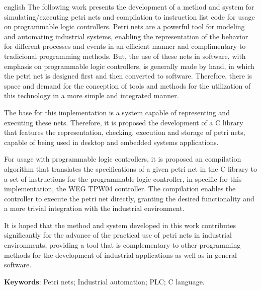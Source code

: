 \begin{resumo}[Abstract]
\begin{otherlanguage*}{english}
The following work presents the development of a method and system for simulating/executing petri nets and compilation to instruction list code for usage on programmable logic controllers. Petri nets are a powerful tool for modeling and automating industrial systems, enabling the representation of the behavior for different processes and events in an efficient manner and complimentary to tradicional programming methods. But, the use of these nets in software, with emphasis on programmable logic controllers, is generally made by hand, in which the petri net is designed first and then converted to software. Therefore,  there is space and demand for the conception of tools and methods for the utilization of this technology in a more simple and integrated manner. 

The base for this implementation is a system capable of representing and executing these nets. Therefore,  it is proposed the development of a C library that features the representation, checking, execution and storage of petri nets, capable of being used in desktop and embedded systems applications. 

For usage with programmable logic controllers, it is proposed an compilation algorithm that translates the specifications of a given petri net in the C library to a set of instructions for the programmable logic controller, in specific for this implementation, the WEG TPW04 controller. The compilation enables the controller to execute the petri net directly, granting the desired functionality and a more trivial integration with the industrial environment.

It is hoped that the method and system developed in this work contributes significantly for the advance of the practical use of petri nets in industrial environments, providing a tool that is complementary to other programming methods for the development of industrial applications as well as in general software.

\textbf{Keywords}: Petri nets; Industrial automation; PLC; C language.
\end{otherlanguage*}
\end{resumo}